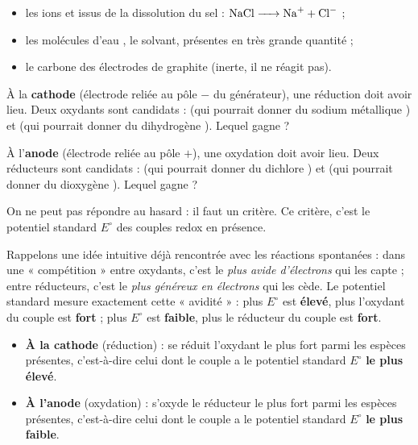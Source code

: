 \documentclass[11pt]{article}
\newcommand{\cle}[1]{{\popxbold\color{popdark}#1}}
\newcounter{popsec}
\newcounter{popsub}
\newcommand{\courssub}[1]{%
  \stepcounter{popsub}%
  \par\vspace{9pt}\noindent{\popxbold\fontsize{11.5}{13}\selectfont\color{popink}{\color{poporange}\thepopsec.\thepopsub}\hspace{6pt}#1}\par\nopagebreak\vspace{4pt}
}
\begin{document}
\begin{itemize}
\item les ions  et  issus de la dissolution du sel : $\ce{NaCl -> Na+ + Cl-}$ ;
\item les molécules d'eau , le solvant, présentes en très grande quantité ;
\item le carbone des électrodes de graphite (inerte, il ne réagit pas).
\end{itemize}

À la \textbf{cathode} (électrode reliée au pôle $-$ du générateur), une réduction doit avoir lieu. Deux oxydants sont candidats :  (qui pourrait donner du sodium métallique ) et  (qui pourrait donner du dihydrogène ). Lequel gagne ?

À l'\textbf{anode} (électrode reliée au pôle $+$), une oxydation doit avoir lieu. Deux réducteurs sont candidats :  (qui pourrait donner du dichlore ) et  (qui pourrait donner du dioxygène ). Lequel gagne ?

On ne peut pas répondre au hasard : il faut un critère. Ce critère, c'est le \cle{potentiel standard} $E^{\circ}$ des couples redox en présence.

\courssub{Les règles de prévision}

Rappelons une idée intuitive déjà rencontrée avec les réactions spontanées : dans une « compétition » entre oxydants, c'est le \emph{plus avide d'électrons} qui les capte ; entre réducteurs, c'est le \emph{plus généreux en électrons} qui les cède. Le potentiel standard mesure exactement cette « avidité » : plus $E^{\circ}$ est \textbf{élevé}, plus l'oxydant du couple est \textbf{fort} ; plus $E^{\circ}$ est \textbf{faible}, plus le réducteur du couple est \textbf{fort}.

\begin{propriete}
\begin{itemize}
\item \textbf{À la cathode} (réduction) : se réduit l'\cle{oxydant le plus fort} parmi les espèces présentes, c'est-à-dire celui dont le couple a le potentiel standard $E^{\circ}$ \textbf{le plus élevé}.
\item \textbf{À l'anode} (oxydation) : s'oxyde le \cle{réducteur le plus fort} parmi les espèces présentes, c'est-à-dire celui dont le couple a le potentiel standard $E^{\circ}$ \textbf{le plus faible}.
\end{itemize}
\end{propriete}
\end{document}
